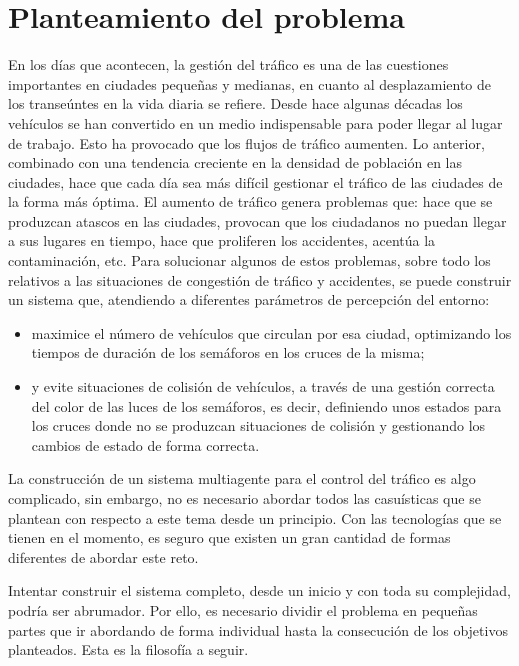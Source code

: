 \section{Planteamiento del problema}
En los días que acontecen, la gestión del tráfico es una de las cuestiones importantes en ciudades pequeñas y medianas, en cuanto al desplazamiento de los transeúntes en la vida diaria se refiere. Desde hace algunas décadas los vehículos se han convertido en un medio indispensable para poder llegar al lugar de trabajo. Esto ha provocado que los flujos de tráfico aumenten. Lo anterior, combinado con una tendencia creciente en la densidad de población en las ciudades, hace que cada día sea más difícil gestionar el tráfico de las ciudades de la forma más óptima. El aumento de tráfico genera problemas que: hace que se produzcan atascos en las ciudades, provocan que los ciudadanos no puedan llegar a sus lugares en tiempo, hace que proliferen los accidentes, acentúa la contaminación, etc. Para solucionar algunos de estos problemas, sobre todo los relativos a las situaciones de congestión de tráfico y accidentes, se puede construir un sistema que, atendiendo a diferentes parámetros de percepción del entorno:
\begin{itemize}
    \item maximice el número de vehículos que circulan por esa ciudad, optimizando los tiempos de duración de los semáforos en los cruces de la misma;
    \item y evite situaciones de colisión de vehículos, a través de una gestión correcta del color de las luces de los semáforos, es decir, definiendo unos estados para los cruces donde no se produzcan situaciones de colisión y gestionando los cambios de estado de forma correcta.
\end{itemize}


    \label{section:problem}
La construcción de un sistema multiagente para el control del tráfico es algo complicado, sin embargo, no es necesario abordar todos las casuísticas que se plantean con respecto a este tema desde un principio. Con las tecnologías que se tienen en el momento, es seguro que existen un gran cantidad de formas diferentes de abordar este reto.

Intentar construir el sistema completo, desde un inicio y con toda su complejidad, podría ser abrumador. Por ello, es necesario dividir el problema en pequeñas partes que ir abordando de forma individual hasta la consecución de los objetivos planteados. Esta es la filosofía a seguir.


